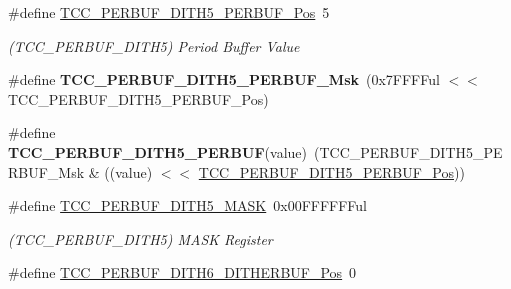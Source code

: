 \begin{DoxyCompactItemize}
\item 
\hypertarget{group___s_a_m_l21___t_c_c_ga505ba8bf978e90b76e7ba1f5e27223e2}{}\#define \hyperlink{group___s_a_m_l21___t_c_c_ga505ba8bf978e90b76e7ba1f5e27223e2}{T\+C\+C\+\_\+\+P\+E\+R\+B\+U\+F\+\_\+\+D\+I\+T\+H5\+\_\+\+P\+E\+R\+B\+U\+F\+\_\+\+Pos}~5\label{group___s_a_m_l21___t_c_c_ga505ba8bf978e90b76e7ba1f5e27223e2}

\begin{DoxyCompactList}\small\item\em (T\+C\+C\+\_\+\+P\+E\+R\+B\+U\+F\+\_\+\+D\+I\+T\+H5) Period Buffer Value \end{DoxyCompactList}\item 
\hypertarget{group___s_a_m_l21___t_c_c_ga1d71b2deb8c5fbf3824f148770176fae}{}\#define {\bfseries T\+C\+C\+\_\+\+P\+E\+R\+B\+U\+F\+\_\+\+D\+I\+T\+H5\+\_\+\+P\+E\+R\+B\+U\+F\+\_\+\+Msk}~(0x7\+F\+F\+F\+Ful $<$$<$ T\+C\+C\+\_\+\+P\+E\+R\+B\+U\+F\+\_\+\+D\+I\+T\+H5\+\_\+\+P\+E\+R\+B\+U\+F\+\_\+\+Pos)\label{group___s_a_m_l21___t_c_c_ga1d71b2deb8c5fbf3824f148770176fae}

\item 
\hypertarget{group___s_a_m_l21___t_c_c_gaba2bd2bffab7ce2b3796251f068984aa}{}\#define {\bfseries T\+C\+C\+\_\+\+P\+E\+R\+B\+U\+F\+\_\+\+D\+I\+T\+H5\+\_\+\+P\+E\+R\+B\+U\+F}(value)~(T\+C\+C\+\_\+\+P\+E\+R\+B\+U\+F\+\_\+\+D\+I\+T\+H5\+\_\+\+P\+E\+R\+B\+U\+F\+\_\+\+Msk \& ((value) $<$$<$ \hyperlink{group___s_a_m_l21___t_c_c_ga505ba8bf978e90b76e7ba1f5e27223e2}{T\+C\+C\+\_\+\+P\+E\+R\+B\+U\+F\+\_\+\+D\+I\+T\+H5\+\_\+\+P\+E\+R\+B\+U\+F\+\_\+\+Pos}))\label{group___s_a_m_l21___t_c_c_gaba2bd2bffab7ce2b3796251f068984aa}

\item 
\hypertarget{group___s_a_m_l21___t_c_c_ga4987a0d5fcb34ae7cb13d06c794cf57a}{}\#define \hyperlink{group___s_a_m_l21___t_c_c_ga4987a0d5fcb34ae7cb13d06c794cf57a}{T\+C\+C\+\_\+\+P\+E\+R\+B\+U\+F\+\_\+\+D\+I\+T\+H5\+\_\+\+M\+A\+S\+K}~0x00\+F\+F\+F\+F\+F\+Ful\label{group___s_a_m_l21___t_c_c_ga4987a0d5fcb34ae7cb13d06c794cf57a}

\begin{DoxyCompactList}\small\item\em (T\+C\+C\+\_\+\+P\+E\+R\+B\+U\+F\+\_\+\+D\+I\+T\+H5) M\+A\+S\+K Register \end{DoxyCompactList}\item 
\hypertarget{group___s_a_m_l21___t_c_c_gaeb8f3be1cefbdd18de66eb1542c0cbfa}{}\#define \hyperlink{group___s_a_m_l21___t_c_c_gaeb8f3be1cefbdd18de66eb1542c0cbfa}{T\+C\+C\+\_\+\+P\+E\+R\+B\+U\+F\+\_\+\+D\+I\+T\+H6\+\_\+\+D\+I\+T\+H\+E\+R\+B\+U\+F\+\_\+\+Pos}~0\label{group___s_a_m_l21___t_c_c_gaeb8f3be1cefbdd18de66eb1542c0cbfa}


\end{DoxyCompactItemize}
